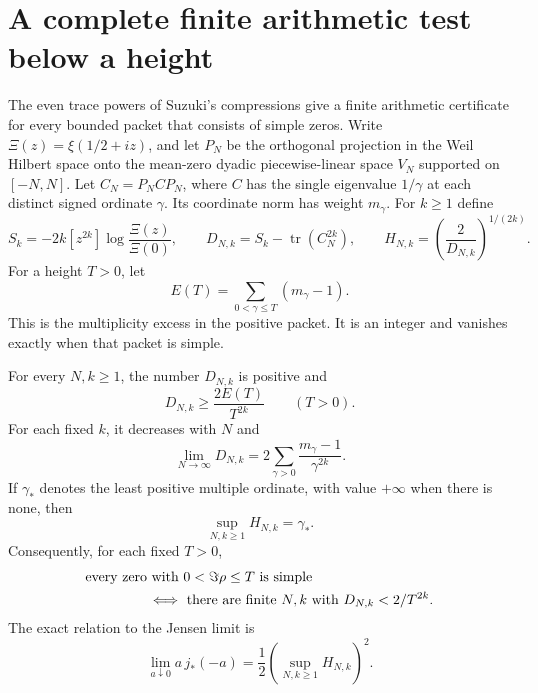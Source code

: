 \section{A complete finite arithmetic test below a height}
\label{sec:fd-arithmetic}
The even trace powers of Suzuki's compressions give a finite arithmetic certificate for every bounded packet that consists of simple zeros.
Write \(\Xi(z)=\xi(1/2+iz)\), and let \(P_N\) be the orthogonal
projection in the Weil Hilbert space onto the mean-zero dyadic
piecewise-linear space \(V_N\) supported on \([-N,N]\).
Let \(C_N=P_NCP_N\), where \(C\) has the single eigenvalue
\(1/\gamma\) at each distinct signed ordinate \(\gamma\).
Its coordinate norm has weight \(m_\gamma\).
For \(k\ge1\) define
\[
 S_k=-2k[z^{2k}]\log\frac{\Xi(z)}{\Xi(0)},\qquad
 D_{N,k}=S_k-\operatorname{tr}(C_N^{2k}),\qquad
 H_{N,k}=\left(\frac2{D_{N,k}}\right)^{1/(2k)}.
\]
For a height \(T>0\), let
\[
 E(T)=\sum_{0<\gamma\le T}(m_\gamma-1).
\]
This is the multiplicity excess in the positive packet. It is an
integer and vanishes exactly when that packet is simple.

\begin{theorem}
\label{thm:fd-arithmetic-complete}
For every \(N,k\ge1\), the number \(D_{N,k}\) is positive and
\[
 D_{N,k}\ge\frac{2E(T)}{T^{2k}}\qquad(T>0).
\]
For each fixed \(k\), it decreases with \(N\) and
\[
 \lim_{N\to\infty}D_{N,k}
   =2\sum_{\gamma>0}\frac{m_\gamma-1}{\gamma^{2k}}.
\]
If \(\gamma_*\) denotes the least positive multiple ordinate,
with value \(+\infty\) when there is none, then
\[
 \sup_{N,k\ge1}H_{N,k}=\gamma_*.
\]
Consequently, for each fixed \(T>0\),
\[
 \begin{split}
 &\text{every zero with }0<\Im\rho\le T\text{ is simple}\\
 &\hspace{16mm}\Longleftrightarrow\
 \text{there are finite }N,k\text{ with }D_{N,k}<2/T^{2k}.
 \end{split}
\]
The exact relation to the Jensen limit is
\[
 \lim_{a\downarrow0}a\,j_*(-a)
   =\frac12\left(\sup_{N,k\ge1}H_{N,k}\right)^2.
\]
\end{theorem}

